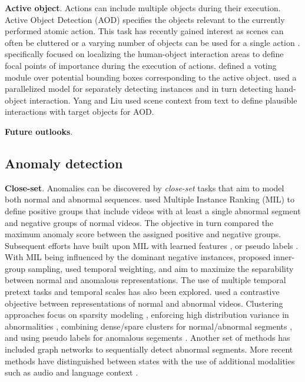 \documentclass[smallextended,twocolumn,natbib]{svjour3}
\begin{document}
\noindent
\textbf{Active object}. Actions can include multiple objects during their execution. Active Object Detection (AOD) specifies the objects relevant to the currently performed atomic action. This task has recently gained interest as scenes can often be cluttered \citep{ragusa2021meccano} or a varying number of objects can be used for a single action \citep{miech2019howto100m}. \citet{nagarajan2019grounded} specifically focused on localizing the human-object interaction areas to define focal points of importance during the execution of actions. \citep{fu2021sequential} defined a voting module over potential bounding boxes corresponding to the active object. \citet{kim2021hotr} used a parallelized model for separately detecting instances and in turn detecting hand-object interaction. Yang and Liu \citep{yang2024active} used scene context from text to define plausible interactions with target objects for AOD.  


\noindent
\textbf{Future outlooks}.



\subsection{Anomaly detection}

\noindent
\textbf{Close-set}. Anomalies can be discovered by \emph{close-set} tasks that aim to model both normal and abnormal sequences. \citet{sultani2018real} used Multiple Instance Ranking (MIL) \citep{dietterich1997solving} to define positive groups that include videos with at least a single abnormal segment and negative groups of normal videos. The objective in turn compared the maximum anomaly score between the assigned positive and negative groups. Subsequent efforts \citep{dubey20193d,zhang2019temporal,zhu2019motion,feng2021mist,tian2021weakly,almarri2024multi} have built upon MIL with learned features \citep{dubey20193d}, or pseudo labels \citep{feng2021mist}. With MIL being influenced by the dominant negative instances, \citep{zhang2019temporal} proposed inner-group sampling, \citep{pu2023learning,zhu2019motion} used temporal weighting, and \citep{tian2021weakly} aim to maximize the separability between normal and anomalous representations. The use of multiple temporal pretext tasks \citep{almarri2024multi,georgescu2021anomaly} and temporal scales \citep{li2022scale} has also been explored. \citep{chen2023mgfn} used a contrastive objective between representations of normal and abnormal videos. Clustering approaches focus on sparsity modeling \citep{lu2013abnormal}, enforcing high distribution variance in abnormalities \citep{li2021deep}, combining dense/spare clusters for normal/abnormal segments \citep{zaheer2020claws}, and using pseudo labels for anomalous segements \citep{zaheer2020self}. Another set of methods \citep{zhong2019graph,purwanto2021dance} has included graph networks to sequentially detect abnormal segments. More recent methods have distinguished between states with the use of additional modalities such as audio \citep{wu2020not} and language context \citep{yang2024text,zanella2024harnessing}.
\end{document}
